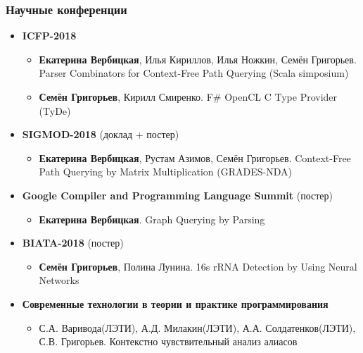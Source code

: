 \documentclass[xcolor=table]{beamer}
\begin{document}
\begin{frame}[fragile]
  \transwipe[direction=90]
  \frametitle{Научные конференции}
\begin{itemize}

      \item \textbf{ICFP-2018}
      \begin{itemize}
        \item \textbf{Екатерина Вербицкая}, Илья Кириллов, Илья Ножкин, Семён Григорьев. Parser Combinators for Context-Free Path Querying (Scala simposium)
        \item \textbf{Семён Григорьев}, Кирилл Смиренко. F\# OpenCL C Type Provider (TyDe)
      \end{itemize}

      \item \textbf{SIGMOD-2018} (доклад + постер)
      \begin{itemize}
        \item \textbf{Екатерина Вербицкая}, Рустам Азимов, Семён Григорьев. Context-Free Path Querying by Matrix Multiplication (GRADES-NDA)
      \end{itemize}
      
      \item \textbf{Google Compiler and Programming Language Summit} (постер)
      \begin{itemize}
        \item \textbf{Екатерина Вербицкая}. Graph Querying by Parsing 
      \end{itemize}

      \item \textbf{BIATA-2018} (постер)
      \begin{itemize}
         \item \textbf{Семён Григорьев}, Полина Лунина. 16s rRNA Detection by Using Neural Networks 
      \end{itemize}
      
      \item \textbf{Современные технологии в теории и практике программирования}
      \begin{itemize}
         \item С.А. Варивода(ЛЭТИ), А.Д. Милакин(ЛЭТИ), А.А. Солдатенков(ЛЭТИ), С.В. Григорьев. Контекстно чувствительный анализ алиасов
      \end{itemize}

\end{itemize}
\end{frame}
 
\end{document}
